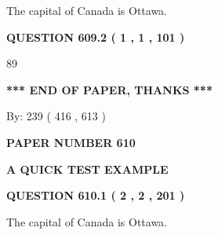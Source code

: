 \documentclass[12pt]{article}
\begin{document}
 
The capital of Canada is Ottawa.
 
 
 
 
  
\vspace{0.2in}
  
{\textbf{\Large{QUESTION
609.2 
 ( 1 , 1 , 101 )
}}}
  
  
 
 
\noindent{}

89
 
 
   
   
 \vspace{0.2in}
 
   
   
   
   
\vspace{1.0in} 
{\textbf{\large{ *** END OF PAPER, THANKS *** }}} 
   
   
\hspace{1.0in} By: 
 239 ( 416 ,  613 )
   
   
   
   
\newpage 
\setcounter{page}{ 
   610001 } 
   
   
   
   
 {\textbf{ \Large{ PAPER NUMBER  610  }}}
   
   
\vspace{0.2in}
   
   
   
   
   
   
 \vspace{0.2in}
{\LARGE {\textbf{ A QUICK TEST EXAMPLE}}}
   
   
  
\vspace{0.2in}
  
{\textbf{\Large{QUESTION
610.1 
 ( 2 , 2 , 201 )
}}}
  
  
 
 
\noindent{}
 
 
The capital of Canada is Ottawa.
 
 
 
 
  
\vspace{0.2in}
  
\end{document}
